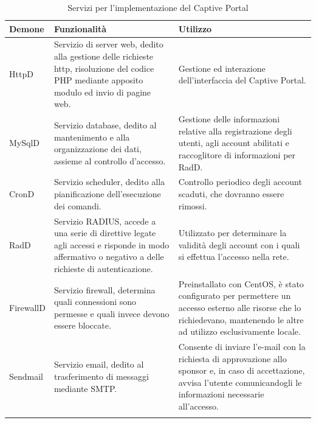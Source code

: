\documentclass[Realizzazione.tex]{subfiles}
\begin{document}
\label{table:Servizi per l'implementazione del Captive Portal}
\renewcommand*{\arraystretch}{1.2}
\begin{longtable}[H]{p{2.6cm}|p{6cm}|p{6cm}}
	\rowcolor{CHeader}
	\color{CHeaderText} \textbf{Demone} & \color{CHeaderText} \textbf{Funzionalità} & \color{CHeaderText} \textbf{Utilizzo} \\
	\endhead
		HttpD
			& Servizio di server web, dedito alla gestione delle richieste http, risoluzione del codice PHP mediante apposito modulo ed invio di pagine web.
			&  Gestione ed interazione dell'interfaccia del Captive Portal. \\
		MySqlD
			& Servizio database, dedito al mantenimento e alla organizzazione dei dati, assieme al controllo d'accesso.
			& Gestione delle informazioni relative alla registrazione degli utenti, agli account abilitati e raccoglitore di informazioni per RadD. \\
		CronD
			& Servizio scheduler, dedito alla pianificazione dell'esecuzione dei comandi.
			& Controllo periodico degli account scaduti, che dovranno essere rimossi. \\
		RadD
			& Servizio RADIUS, accede a una serie di direttive legate agli accessi e risponde in modo affermativo o negativo a delle richieste di autenticazione.
			& Utilizzato per determinare la validità degli account con i quali si effettua l'accesso nella rete. \\
		FirewallD
			& Servizio firewall, determina quali connessioni sono permesse e quali invece devono essere bloccate.
			& Preinstallato con CentOS, è stato configurato per permettere un accesso esterno alle risorse che lo richiedevano, mantenendo le altre ad utilizzo esclusivamente locale. \\
		Sendmail
			& Servizio email, dedito al trasferimento di messaggi mediante SMTP.
			& Consente di inviare l'e-mail con la richiesta di approvazione allo sponsor e, in caso di accettazione, avvisa l'utente comunicandogli le informazioni necessarie all'accesso. \\
	\hiderowcolors
	\caption{Servizi per l'implementazione del Captive Portal}
\end{longtable}
\end{document}
